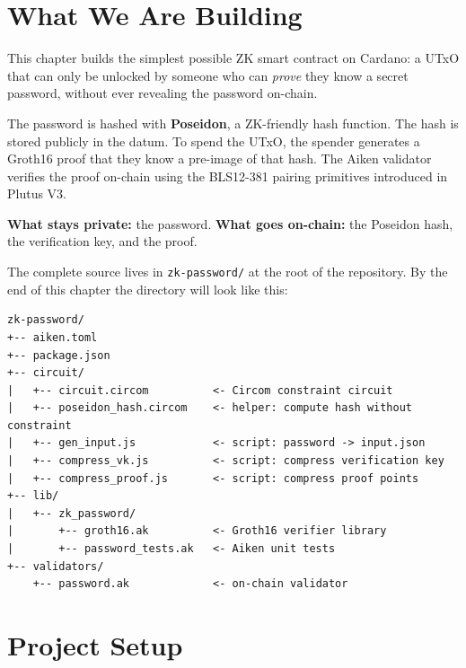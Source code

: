 
\section{What We Are Building} \label{sec:ch6-overview}

This chapter builds the simplest possible ZK smart contract on Cardano: a UTxO
that can only be unlocked by someone who can \emph{prove} they know a secret
password, without ever revealing the password on-chain.

The password is hashed with \textbf{Poseidon}, a ZK-friendly hash function. The
hash is stored publicly in the datum. To spend the UTxO, the spender generates a
Groth16 proof that they know a pre-image of that hash. The Aiken validator
verifies the proof on-chain using the BLS12-381 pairing primitives introduced
in Plutus V3.

\begin{highlight}
\textbf{What stays private:} the password. \quad
\textbf{What goes on-chain:} the Poseidon hash, the verification key, and the proof.
\end{highlight}

The complete source lives in \texttt{zk-password/} at the root of the repository.
By the end of this chapter the directory will look like this:

\begin{verbatim}
zk-password/
+-- aiken.toml
+-- package.json
+-- circuit/
|   +-- circuit.circom          <- Circom constraint circuit
|   +-- poseidon_hash.circom    <- helper: compute hash without constraint
|   +-- gen_input.js            <- script: password -> input.json
|   +-- compress_vk.js          <- script: compress verification key
|   +-- compress_proof.js       <- script: compress proof points
+-- lib/
|   +-- zk_password/
|       +-- groth16.ak          <- Groth16 verifier library
|       +-- password_tests.ak   <- Aiken unit tests
+-- validators/
    +-- password.ak             <- on-chain validator
\end{verbatim}

\section{Project Setup} \label{sec:ch6-setup}

